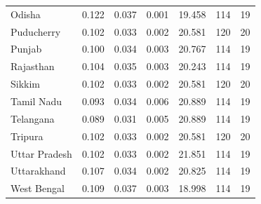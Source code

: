 \begin{tabular}{lrrrrrr}
Odisha & 0.122 & 0.037 & 0.001 & 19.458 & 114 & 19 \\
Puducherry & 0.102 & 0.033 & 0.002 & 20.581 & 120 & 20 \\
Punjab & 0.100 & 0.034 & 0.003 & 20.767 & 114 & 19 \\
Rajasthan & 0.104 & 0.035 & 0.003 & 20.243 & 114 & 19 \\
Sikkim & 0.102 & 0.033 & 0.002 & 20.581 & 120 & 20 \\
Tamil Nadu & 0.093 & 0.034 & 0.006 & 20.889 & 114 & 19 \\
Telangana & 0.089 & 0.031 & 0.005 & 20.889 & 114 & 19 \\
Tripura & 0.102 & 0.033 & 0.002 & 20.581 & 120 & 20 \\
Uttar Pradesh & 0.102 & 0.033 & 0.002 & 21.851 & 114 & 19 \\
Uttarakhand & 0.107 & 0.034 & 0.002 & 20.825 & 114 & 19 \\
West Bengal & 0.109 & 0.037 & 0.003 & 18.998 & 114 & 19 \\
\bottomrule
\end{tabular}
